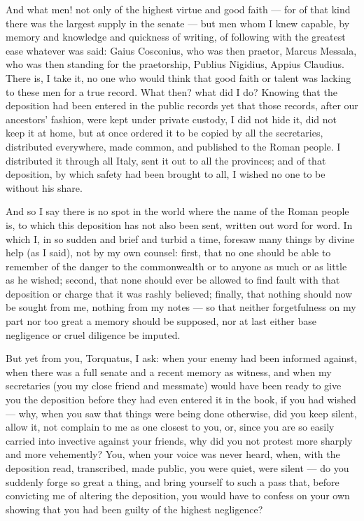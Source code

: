  And what men! not only of the highest virtue and good faith --- for of that kind there was the largest supply in the senate --- but men whom I knew capable, by memory and knowledge and quickness of writing, of following with the greatest ease whatever was said: Gaius Cosconius, who was then praetor, Marcus Messala, who was then standing for the praetorship, Publius Nigidius, Appius Claudius. There is, I take it, no one who would think that good faith or talent was lacking to these men for a true record. What then? what did I do? Knowing that the deposition had been entered in the public records yet that those records, after our ancestors' fashion, were kept under private custody, I did not hide it, did not keep it at home, but at once ordered it to be copied by all the secretaries, distributed everywhere, made common, and published to the Roman people. I distributed it through all Italy, sent it out to all the provinces; and of that deposition, by which safety had been brought to all, I wished no one to be without his share.

 And so I say there is no spot in the world where the name of the Roman people is, to which this deposition has not also been sent, written out word for word. In which I, in so sudden and brief and turbid a time, foresaw many things by divine help (as I said), not by my own counsel: first, that no one should be able to remember of the danger to the commonwealth or to anyone as much or as little as he wished; second, that none should ever be allowed to find fault with that deposition or charge that it was rashly believed; finally, that nothing should now be sought from me, nothing from my notes --- so that neither forgetfulness on my part nor too great a memory should be supposed, nor at last either base negligence or cruel diligence be imputed.

 But yet from you, Torquatus, I ask: when your enemy had been informed against, when there was a full senate and a recent memory as witness, and when my secretaries (you my close friend and messmate) would have been ready to give you the deposition before they had even entered it in the book, if you had wished --- why, when you saw that things were being done otherwise, did you keep silent, allow it, not complain to me as one closest to you, or, since you are so easily carried into invective against your friends, why did you not protest more sharply and more vehemently? You, when your voice was never heard, when, with the deposition read, transcribed, made public, you were quiet, were silent --- do you suddenly forge so great a thing, and bring yourself to such a pass that, before convicting me of altering the deposition, you would have to confess on your own showing that you had been guilty of the highest negligence?

